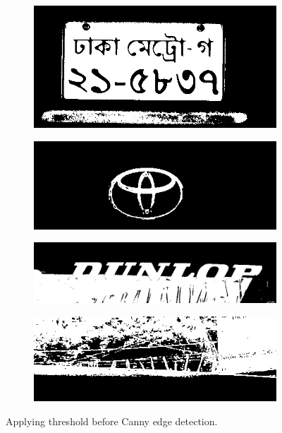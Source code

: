 \documentclass{standalone}
\begin{document}
\begin{figure}
\begin{subfigure}{.5\textwidth}
  \centering
  \includegraphics[width=.8\linewidth]{./img/sample/stage7-1.jpg}
\end{subfigure}
\begin{subfigure}{.5\textwidth}
  \centering
  \includegraphics[width=.8\linewidth]{./img/sample/stage7-2.jpg}
\end{subfigure}
\begin{subfigure}{.5\textwidth}
  \centering
  \includegraphics[width=.8\linewidth]{./img/sample/stage7-3.jpg}
\end{subfigure}
\begin{subfigure}{.5\textwidth}
  \centering
  \includegraphics[width=.8\linewidth]{./img/sample/stage7-4.jpg}
\end{subfigure}
\caption{Applying threshold before Canny edge detection.}
\label{fig:ThresholdCanny}
\end{figure}
\end{document}
